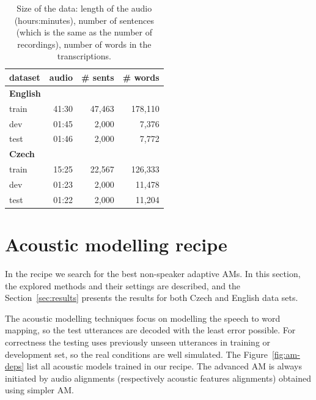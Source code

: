 \begin{table}[hbp]
    \centering
    \begin{tabular}{lrrr}
        \hline
            dataset & audio & \# sents & \# words \\
        \hline
        \textbf{English} & & & \\
                train & 41:30 & 47,463 & 178,110 \\
                dev & 01:45 & 2,000 & 7,376 \\
                test & 01:46 & 2,000 & 7,772 \\
        \hline
        \textbf{Czech} & & & \\
                train & 15:25 & 22,567 & 126,333 \\
                dev & 01:23 & 2,000 & 11,478 \\
                test & 01:22 & 2,000 & 11,204 \\
        \hline
		\end{tabular}
    \caption{Size of the data: length of the audio (hours:minutes), number of sentences
        (which is the same as the number of recordings), number of words in the 
    transcriptions.\cite{korvas_2014}}
    \label{tab:audio}
\end{table}





\section{Acoustic modelling recipe}
\label{sec:am_train}

In the recipe we search for the best non-speaker adaptive \acp{AM}. 
In this section, the explored methods and their settings are described, and the Section~\ref{sec:results} presents the results for both Czech and English data sets.

The acoustic modelling techniques focus on modelling the speech to word mapping, so the test utterances are decoded with the least error possible. 
For correctness the testing uses previously unseen utterances in training or development set, so the real conditions are well simulated.
The Figure~\ref{fig:am-deps} list all acoustic models trained in our recipe.
The advanced \ac{AM} is always initiated by audio alignments (respectively acoustic features alignments) obtained using simpler \ac{AM}.

